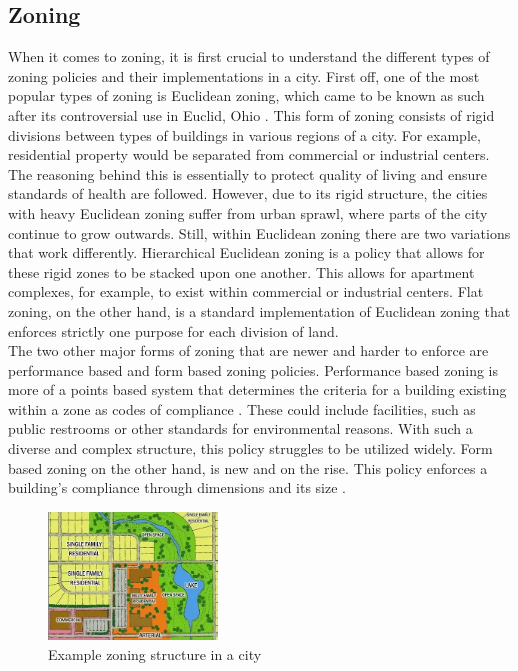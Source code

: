 \documentclass[11pt]{article}
\begin{document}
\begin{multicols}{2}
    \subsection{Zoning} \label{zoning}
    \quad When it comes to zoning, it is first crucial to understand the different types of zoning policies and their implementations in a city. First off, one of the most popular types of zoning is Euclidean zoning, which came to be known as such after its controversial use in Euclid, Ohio \cite{zoning}. This form of zoning consists of rigid divisions between types of buildings in various regions of a city. For example, residential property would be separated from commercial or industrial centers. The reasoning behind this is essentially to protect quality of living and ensure standards of health are followed. However, due to its rigid structure, the cities with heavy Euclidean zoning suffer from urban sprawl, where parts of the city continue to grow outwards. Still, within Euclidean zoning there are two variations that work differently. Hierarchical Euclidean zoning is a policy that allows for these rigid zones to be stacked upon one another. This allows for apartment complexes, for example, to exist within commercial or industrial centers. Flat zoning, on the other hand, is a standard implementation of Euclidean zoning that enforces strictly one purpose for each division of land.\\

    \quad The two other major forms of zoning that are newer and harder to enforce are performance based and form based zoning policies. Performance based zoning is more of a points based system that determines the criteria for a building existing within a zone as codes of compliance \cite{zoning}. These could include facilities, such as public restrooms or other standards for environmental reasons. With such a diverse and complex structure, this policy struggles to be utilized widely. Form based zoning on the other hand, is new and on the rise. This policy enforces a building's compliance through dimensions and its size \cite{zoning}. \\

    \begin{figure}[H]
        \centering
        \includegraphics[width=0.4\textwidth]{images/zoning.png}
        \caption{Example zoning structure in a city \cite{zoningdiagram}}
        \label{fig:zoningdiagram}
    \end{figure}


\end{multicols}
\end{document}
